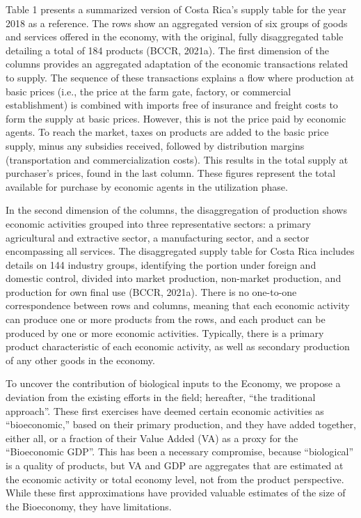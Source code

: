 \documentclass[
  letterpaper,
  DIV=11,
  numbers=noendperiod]{scrartcl}
\begin{document}
Table 1 presents a summarized version of Costa Rica's supply table for
the year 2018 as a reference. The rows show an aggregated version of six
groups of goods and services offered in the economy, with the original,
fully disaggregated table detailing a total of 184 products (BCCR,
2021a). The first dimension of the columns provides an aggregated
adaptation of the economic transactions related to supply. The sequence
of these transactions explains a flow where production at basic prices
(i.e., the price at the farm gate, factory, or commercial establishment)
is combined with imports free of insurance and freight costs to form the
supply at basic prices. However, this is not the price paid by economic
agents. To reach the market, taxes on products are added to the basic
price supply, minus any subsidies received, followed by distribution
margins (transportation and commercialization costs). This results in
the total supply at purchaser's prices, found in the last column. These
figures represent the total available for purchase by economic agents in
the utilization phase.

In the second dimension of the columns, the disaggregation of production
shows economic activities grouped into three representative sectors: a
primary agricultural and extractive sector, a manufacturing sector, and
a sector encompassing all services. The disaggregated supply table for
Costa Rica includes details on 144 industry groups, identifying the
portion under foreign and domestic control, divided into market
production, non-market production, and production for own final use
(BCCR, 2021a). There is no one-to-one correspondence between rows and
columns, meaning that each economic activity can produce one or more
products from the rows, and each product can be produced by one or more
economic activities. Typically, there is a primary product
characteristic of each economic activity, as well as secondary
production of any other goods in the economy.

To uncover the contribution of biological inputs to the Economy, we
propose a deviation from the existing efforts in the field; hereafter,
``the traditional approach''. These first exercises have deemed certain
economic activities as ``bioeconomic,'' based on their primary
production, and they have added together, either all, or a fraction of
their Value Added (VA) as a proxy for the ``Bioeconomic GDP''. This has
been a necessary compromise, because ``biological'' is a quality of
products, but VA and GDP are aggregates that are estimated at the
economic activity or total economy level, not from the product
perspective. While these first approximations have provided valuable
estimates of the size of the Bioeconomy, they have limitations.
\end{document}
